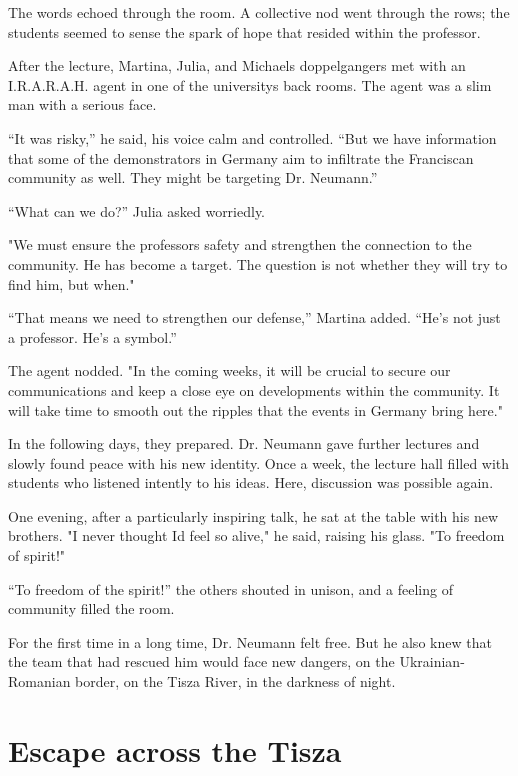 \documentclass[
]{article}
\begin{document}
The words echoed through the room. A collective nod went through the rows; the students seemed to sense the spark of hope that resided within the professor.

After the lecture, Martina, Julia, and Michael\textquotesingle s doppelgangers met with an I.R.A.R.A.H. agent in one of the university\textquotesingle s back rooms. The agent was a slim man with a serious face.

``It was risky,'' he said, his voice calm and controlled. ``But we have information that some of the demonstrators in Germany aim to infiltrate the Franciscan community as well. They might be targeting Dr. Neumann.''

``What can we do?'' Julia asked worriedly.

"We must ensure the professor\textquotesingle s safety and strengthen the connection to the community. He has become a target. The question is not whether they will try to find him, but when."

``That means we need to strengthen our defense,'' Martina added. ``He's not just a professor. He's a symbol.''

The agent nodded. "In the coming weeks, it will be crucial to secure our communications and keep a close eye on developments within the community. It will take time to smooth out the ripples that the events in Germany bring here."

In the following days, they prepared. Dr. Neumann gave further lectures and slowly found peace with his new identity. Once a week, the lecture hall filled with students who listened intently to his ideas. Here, discussion was possible again.

One evening, after a particularly inspiring talk, he sat at the table with his new brothers. "I never thought I\textquotesingle d feel so alive," he said, raising his glass. "To freedom of spirit!"

``To freedom of the spirit!'' the others shouted in unison, and a feeling of community filled the room.

For the first time in a long time, Dr. Neumann felt free. But he also knew that the team that had rescued him would face new dangers, on the Ukrainian-Romanian border, on the Tisza River, in the darkness of night.

\section{Escape across the Tisza}\label{escape-across-the-tisza}
\end{document}
